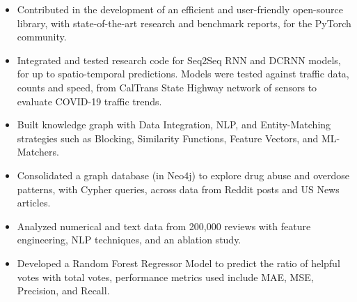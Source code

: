 \documentclass[10pt,a4paper]{altacv}
\begin{document}
\medskip





\begin{itemize}
  \item \small Contributed in the development of an efficient and user-friendly open-source library, with state-of-the-art research and benchmark reports, for the PyTorch community.
    \item \small Integrated and tested research code for Seq2Seq RNN and DCRNN models, for up to spatio-temporal predictions. Models were tested against traffic data, counts and speed, from CalTrans State Highway network of sensors to evaluate COVID-19 traffic trends. 
\end{itemize}

\medskip




\begin{itemize}
  \item \small Built knowledge graph with Data Integration, NLP, and Entity-Matching strategies such as Blocking, Similarity Functions, Feature Vectors, and ML-Matchers.
    \item \small Consolidated a graph database (in Neo4j) to explore drug abuse and overdose patterns, with Cypher queries, across data from Reddit posts and US News articles. 
\end{itemize}

\medskip



\begin{itemize}
  \item \small Analyzed numerical and text data from 200,000 reviews with feature engineering, NLP techniques, and an ablation study. 
    \item \small Developed a Random Forest Regressor Model to predict the ratio of helpful votes with total votes, performance metrics used include MAE, MSE, Precision, and Recall. 
\end{itemize}
\end{document}
